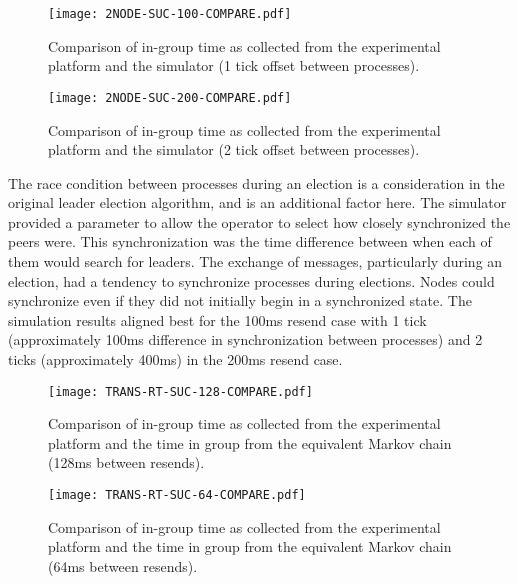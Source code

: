 \begin{figure}
\centering
\begin{minipage}{0.45\textwidth}
    \centering
    \texttt{[image: 2NODE-SUC-100-COMPARE.pdf]}
    \caption{Comparison of in-group time as collected from the experimental platform and the simulator (1 tick offset between processes).}
    \label{fig:COMPARE-SUC-2NODE-100}
\end{minipage}%
\qquad
\begin{minipage}{0.45\textwidth}
    \centering
    \texttt{[image: 2NODE-SUC-200-COMPARE.pdf]}
    \caption{Comparison of in-group time as collected from the experimental platform and the simulator (2 tick offset between processes).}
    \label{fig:COMPARE-SUC-2NODE-200}
\end{minipage}
\end{figure}

The race condition between processes during an election is a consideration in the original leader election algorithm, and is an additional factor here.
The simulator provided a parameter to allow the operator to select how closely synchronized the peers were.
This synchronization was the time difference between when each of them would search for leaders.
The exchange of messages, particularly during an election, had a tendency to synchronize processes during elections.
Nodes could synchronize even if they did not initially begin in a synchronized state. 
The simulation results aligned best for the 100ms resend case with 1 tick (approximately 100ms difference in synchronization between processes) and 2 ticks (approximately 400ms) in the 200ms resend case.

\begin{figure}
\centering
\begin{minipage}{0.45\textwidth}
    \centering
    \texttt{[image: TRANS-RT-SUC-128-COMPARE.pdf]}
    \caption{Comparison of in-group time as collected from the experimental platform and the time in group from the equivalent Markov chain (128ms between resends).}
    \label{fig:COMPARE-SUC-TRANS-RT-128}
\end{minipage}%
\qquad
\begin{minipage}{0.45\textwidth}
    \centering
    \texttt{[image: TRANS-RT-SUC-64-COMPARE.pdf]}
    \caption{Comparison of in-group time as collected from the experimental platform and the time in group from the equivalent Markov chain (64ms between resends).}
    \label{fig:COMPARE-SUC-TRANS-RT-64}
\end{minipage}
\end{figure}

